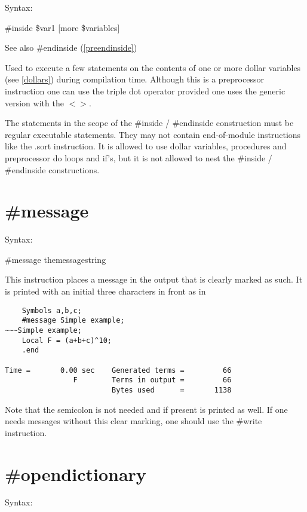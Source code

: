 \noindent Syntax:

\#inside \$var1 [more \$variables]
 
\noindent See also \#endinside (\ref{preendinside})

\noindent Used to execute a few statements on the contents 
of one or more dollar variables (see \ref{dollars}) during compilation time.
Although this is a preprocessor instruction one can use the 
triple dot operator provided one uses the generic version with the $<>$.

\noindent The statements in the scope of the \#inside / \#endinside 
construction must be regular executable statements. They may not contain 
end-of-module instructions like the .sort instruction. It is allowed to use 
dollar variables, procedures and preprocessor do loops and if's, but it is 
not allowed to nest the \#inside / \#endinside constructions.


\section{\#message}
\label{premessage}

\noindent Syntax:

\#message themessagestring

\noindent This instruction places a message in the output 
that is clearly marked as such. It is printed with an initial three 
characters in front as in
\begin{verbatim}
    Symbols a,b,c;
    #message Simple example;
~~~Simple example;
    Local F = (a+b+c)^10;
    .end

Time =       0.00 sec    Generated terms =         66
                F        Terms in output =         66
                         Bytes used      =       1138
\end{verbatim}
Note that the semicolon is not needed and if present is 
printed as well. If one needs messages without this clear marking, one 
should use the \#write instruction.
 
 
\section{\#opendictionary}
\label{preopendictionary}

\noindent Syntax:


